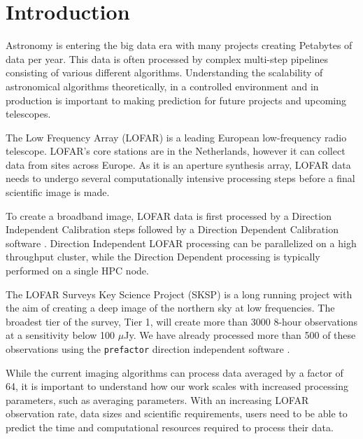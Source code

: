 \documentclass[preprint,5p]{elsarticle}
\begin{document}
%

\section{\label{sec:intro}Introduction }

Astronomy is entering the big data era with many projects creating Petabytes of data per year. This data is often processed by complex multi-step pipelines consisting of various different algorithms. Understanding the scalability of astronomical algorithms theoretically, in a controlled environment and in production is important to making prediction for future projects and upcoming telescopes. 

The Low Frequency Array (LOFAR) \citep{LOFAR} is a leading European low-frequency radio telescope. LOFAR's core stations are in the Netherlands, however it can collect data from sites across Europe. As it is an aperture synthesis array, LOFAR data needs to undergo several computationally intensive processing steps before a final scientific image is made. 

To create a broadband image, LOFAR data is first processed by a Direction Independent Calibration steps followed by a Direction Dependent Calibration software \citep{lofar_prefactor, Wendy_bootes,tassesmirnov, tasse2018faceting}. Direction Independent LOFAR processing can be parallelized on a high throughput cluster, while the Direction Dependent processing is typically performed on a single HPC node. 

The LOFAR Surveys Key Science Project (SKSP) \citep{lotss} is a long running project with the aim of creating a deep image of the northern sky at low frequencies. The broadest tier of the survey, Tier 1, will create more than 3000 8-hour observations at a sensitivity below 100 $\mu$Jy. We have already processed more than 500 of these observations using the \texttt{prefactor} direction independent software \citep{prefactor_zenodo}. 

While the current imaging algorithms can process data averaged by a factor of 64, it is important to understand how our work scales with increased processing parameters, such as averaging parameters. With an increasing LOFAR observation rate, data sizes and scientific requirements, users need to be able to predict the time and computational resources required to process their data.  
\end{document}
